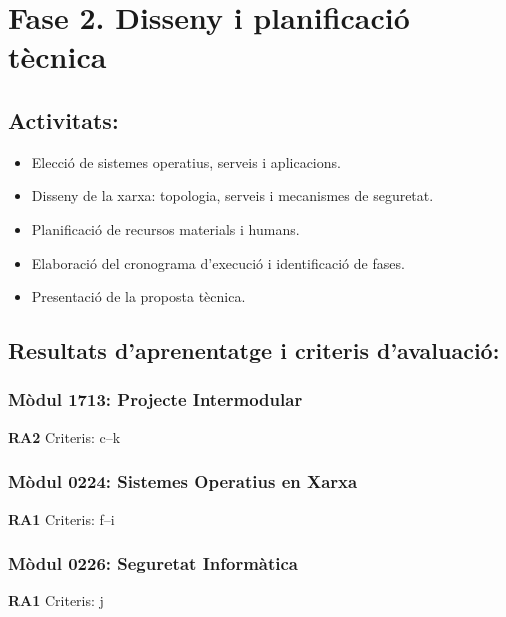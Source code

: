 \documentclass[
  a4paper,
]{article}
\providecommand{\tightlist}{%
  \setlength{\itemsep}{0pt}\setlength{\parskip}{0pt}}
\begin{document}
\section{Fase 2. Disseny i planificació
tècnica}\label{fase-2.-disseny-i-planificaciuxf3-tuxe8cnica}

\subsection{Activitats:}\label{activitats-1}

\begin{itemize}
\tightlist
\item
  Elecció de sistemes operatius, serveis i aplicacions.
\item
  Disseny de la xarxa: topologia, serveis i mecanismes de seguretat.
\item
  Planificació de recursos materials i humans.
\item
  Elaboració del cronograma d'execució i identificació de fases.
\item
  Presentació de la proposta tècnica.
\end{itemize}

\subsection{Resultats d'aprenentatge i criteris
d'avaluació:}\label{resultats-daprenentatge-i-criteris-davaluaciuxf3-1}

\subsubsection{Mòdul 1713: Projecte
Intermodular}\label{muxf2dul-1713-projecte-intermodular-1}

\textbf{RA2} Criteris: c--k

\subsubsection{Mòdul 0224: Sistemes Operatius en
Xarxa}\label{muxf2dul-0224-sistemes-operatius-en-xarxa-1}

\textbf{RA1} Criteris: f--i

\subsubsection{Mòdul 0226: Seguretat
Informàtica}\label{muxf2dul-0226-seguretat-informuxe0tica-1}

\textbf{RA1} Criteris: j
\end{document}
